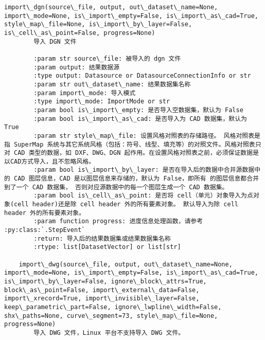 \documentclass[11pt]{article}
\begin{document}
\begin{Verbatim}[commandchars=\\\{\}]
    import\_dgn(source\_file, output, out\_dataset\_name=None, import\_mode=None, is\_import\_empty=False, is\_import\_as\_cad=True, style\_map\_file=None, is\_import\_by\_layer=False, is\_cell\_as\_point=False, progress=None)
        导入 DGN 文件
        
        :param str source\_file: 被导入的 dgn 文件
        :param output: 结果数据源
        :type output: Datasource or DatasourceConnectionInfo or str
        :param str out\_dataset\_name: 结果数据集名称
        :param import\_mode: 导入模式
        :type import\_mode: ImportMode or str
        :param bool is\_import\_empty: 是否导入空数据集，默认为 False
        :param bool is\_import\_as\_cad: 是否导入为 CAD 数据集，默认为 True
        :param str style\_map\_file: 设置风格对照表的存储路径。 风格对照表是指 SuperMap 系统与其它系统风格（包括：符号、线型、填充等）的对照文件。风格对照表只对 CAD 类型的数据，如 DXF、DWG、DGN 起作用。在设置风格对照表之前，必须保证数据是以CAD方式导入，且不忽略风格。
        :param bool is\_import\_by\_layer: 是否在导入后的数据中合并源数据中的 CAD 图层信息，CAD 是以图层信息来存储的，默认为 False，即所有 的图层信息都合并到了一个 CAD 数据集， 否则对应源数据中的每一个图层生成一个 CAD 数据集。
        :param bool is\_cell\_as\_point: 是否将 cell（单元）对象导入为点对象(cell header)还是除 cell header 外的所有要素对象。 默认导入为除 cell header 外的所有要素对象。
        :param function progress: 进度信息处理函数，请参考 :py:class:`.StepEvent`
        :return: 导入后的结果数据集或结果数据集名称
        :rtype: list[DatasetVector] or list[str]
    
    import\_dwg(source\_file, output, out\_dataset\_name=None, import\_mode=None, is\_import\_empty=False, is\_import\_as\_cad=True, is\_import\_by\_layer=False, ignore\_block\_attrs=True, block\_as\_point=False, import\_external\_data=False, import\_xrecord=True, import\_invisible\_layer=False, keep\_parametric\_part=False, ignore\_lwpline\_width=False, shx\_paths=None, curve\_segment=73, style\_map\_file=None, progress=None)
        导入 DWG 文件，Linux 平台不支持导入 DWG 文件。
        

\end{Verbatim}
\end{document}
